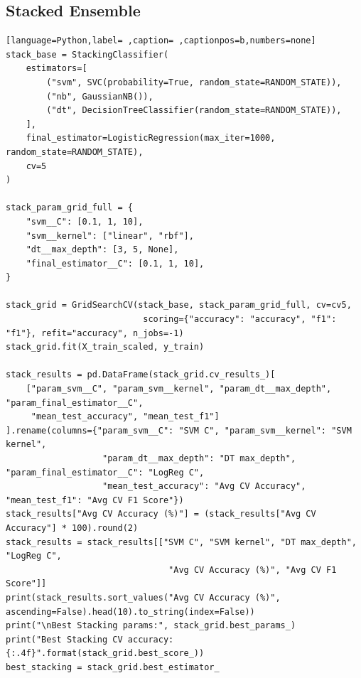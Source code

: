 \documentclass[12pt,a4paper]{article}
\begin{document}
\subsection{Stacked Ensemble}
\label{sec:org07c86ae}
\begin{lstlisting}[language=Python,label= ,caption= ,captionpos=b,numbers=none]
stack_base = StackingClassifier(
    estimators=[
        ("svm", SVC(probability=True, random_state=RANDOM_STATE)),
        ("nb", GaussianNB()),
        ("dt", DecisionTreeClassifier(random_state=RANDOM_STATE)),
    ],
    final_estimator=LogisticRegression(max_iter=1000, random_state=RANDOM_STATE),
    cv=5
)

stack_param_grid_full = {
    "svm__C": [0.1, 1, 10],
    "svm__kernel": ["linear", "rbf"],
    "dt__max_depth": [3, 5, None],
    "final_estimator__C": [0.1, 1, 10],
}

stack_grid = GridSearchCV(stack_base, stack_param_grid_full, cv=cv5,
                           scoring={"accuracy": "accuracy", "f1": "f1"}, refit="accuracy", n_jobs=-1)
stack_grid.fit(X_train_scaled, y_train)

stack_results = pd.DataFrame(stack_grid.cv_results_)[
    ["param_svm__C", "param_svm__kernel", "param_dt__max_depth", "param_final_estimator__C",
     "mean_test_accuracy", "mean_test_f1"]
].rename(columns={"param_svm__C": "SVM C", "param_svm__kernel": "SVM kernel",
                   "param_dt__max_depth": "DT max_depth", "param_final_estimator__C": "LogReg C",
                   "mean_test_accuracy": "Avg CV Accuracy", "mean_test_f1": "Avg CV F1 Score"})
stack_results["Avg CV Accuracy (%)"] = (stack_results["Avg CV Accuracy"] * 100).round(2)
stack_results = stack_results[["SVM C", "SVM kernel", "DT max_depth", "LogReg C",
                                "Avg CV Accuracy (%)", "Avg CV F1 Score"]]
print(stack_results.sort_values("Avg CV Accuracy (%)", ascending=False).head(10).to_string(index=False))
print("\nBest Stacking params:", stack_grid.best_params_)
print("Best Stacking CV accuracy: {:.4f}".format(stack_grid.best_score_))
best_stacking = stack_grid.best_estimator_
\end{lstlisting}
\end{document}
